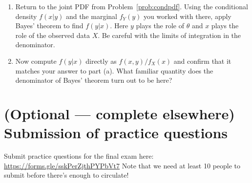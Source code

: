 \documentclass[11pt]{article}
\begin{document}
\begin{enumerate}[label=\alph*.]
\item Return to the joint PDF from Problem~\ref{prob:condpdf}. Using
  the conditional density \(f(x|y)\) and the marginal \(f_Y(y)\) you
  worked with there, apply Bayes' theorem to find \(f(y|x)\). Here
  \(y\) plays the role of \(\theta\) and \(x\) plays the role of the
  observed data \(X\). Be careful with the limits of integration in
  the denominator. 
\item Now compute \(f(y|x)\) directly as \(f(x,y) / f_X(x)\) and
  confirm that it matches your answer to part (a). What familiar
  quantity does the denominator of Bayes' theorem turn out to be here?
\end{enumerate}



\section*{(Optional --- complete elsewhere) Submission of practice questions}

Submit practice questions for the final exam here:
\url{https://forms.gle/sskPerZjthPYPbVt7} Note that we need at least 10
people to submit before there's enough to circulate!
\end{document}
